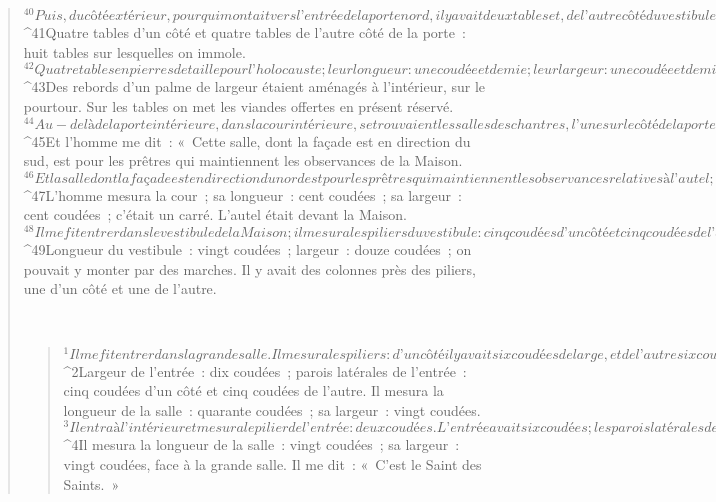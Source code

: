 \begin{verse}
${}^{40}Puis, du côté extérieur, pour qui montait vers l’entrée de la porte nord, il y avait deux tables et, de l’autre côté du vestibule de la porte, deux tables. 
${}^{41}Quatre tables d’un côté et quatre tables de l’autre côté de la porte : huit tables sur lesquelles on immole. 
${}^{42}Quatre tables en pierres de taille pour l’holocauste ; leur longueur : une coudée et demie ; leur largeur : une coudée et demie ; leur hauteur : une coudée. Sur ces tables, on dépose les instruments pour immoler les victimes des holocaustes et des sacrifices. 
${}^{43}Des rebords d’un palme de largeur étaient aménagés à l’intérieur, sur le pourtour. Sur les tables on met les viandes offertes en présent réservé.
${}^{44}Au-delà de la porte intérieure, dans la cour intérieure, se trouvaient les salles des chantres, l’une sur le côté de la porte nord, avec sa façade au sud ; l’autre sur le côté de la porte sud, avec sa façade au nord. 
${}^{45}Et l’homme me dit : « Cette salle, dont la façade est en direction du sud, est pour les prêtres qui maintiennent les observances de la Maison. 
${}^{46}Et la salle dont la façade est en direction du nord est pour les prêtres qui maintiennent les observances relatives à l’autel ; ce sont les fils de Sadoc qui, parmi les fils de Lévi, s’approchent du Seigneur pour le servir. »
${}^{47}L’homme mesura la cour ; sa longueur : cent coudées ; sa largeur : cent coudées ; c’était un carré. L’autel était devant la Maison. 
${}^{48}Il me fit entrer dans le vestibule de la Maison ; il mesura les piliers du vestibule : cinq coudées d’un côté et cinq coudées de l’autre. Largeur de la porte : trois coudées d’un côté et trois coudées de l’autre. 
${}^{49}Longueur du vestibule : vingt coudées ; largeur : douze coudées ; on pouvait y monter par des marches. Il y avait des colonnes près des piliers, une d’un côté et une de l’autre.
      
         
      \bchapter{}
      \begin{verse}
${}^{1}Il me fit entrer dans la grande salle. Il mesura les piliers : d’un côté il y avait six coudées de large, et de l’autre six coudées de large. 
${}^{2}Largeur de l’entrée : dix coudées ; parois latérales de l’entrée : cinq coudées d’un côté et cinq coudées de l’autre. Il mesura la longueur de la salle : quarante coudées ; sa largeur : vingt coudées. 
${}^{3}Il entra à l’intérieur et mesura le pilier de l’entrée : deux coudées. L’entrée avait six coudées ; les parois latérales de l’entrée, sept coudées. 
${}^{4}Il mesura la longueur de la salle : vingt coudées ; sa largeur : vingt coudées, face à la grande salle. Il me dit : « C’est le Saint des Saints. »
      

\end{verse}
\end{verse}
